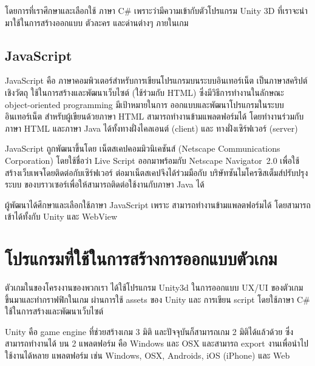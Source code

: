 โดยการที่เราศึกษาและเลือกใช้ ภาษา C\# เพราะว่ามีความเข้ากับตัวโปรแกรม 
Unity 3D ที่เราจะนำมาใช้ในการสร้างออกแบบ ตัวละคร และด่านต่างๆ ภายในเกม

\subsection{JavaScript}
JavaScript คือ ภาษาคอมพิวเตอร์สำหรับการเขียนโปรแกรมบนระบบอินเทอร์เน็ต 
เป็นภาษาสคริปต์เชิงวัตถุ ใช้ในการสร้างและพัฒนาเว็บไซต์ (ใช้ร่วมกับ HTML) 
ซึ่งมีวิธีการทำงานในลักษณะ object-oriented programming มีเป้าหมายในการ 
ออกแบบและพัฒนาโปรแกรมในระบบอินเทอร์เน็ต สำหรับผู้เขียนด้วยภาษา HTML 
สามารถทำงานข้ามแพลตฟอร์มได้ โดยทำงานร่วมกับภาษา HTML และภาษา Java 
ได้ทั้งทางฝั่งไคลเอนต์ (client) และ ทางฝั่งเซิร์ฟเวอร์ (server)

JavaScript ถูกพัฒนาขึ้นโดย เน็ตสเคปคอมมิวนิเคชันส์ 
(Netscape Communications Corporation) 
โดยใช้ชื่อว่า Live Script ออกมาพร้อมกับ Netscape Navigator~2.0 
เพื่อใช้สร้างเว็บเพจโดยติดต่อกับเซิร์ฟเวอร์
ต่อมาเน็ตสเคปจึงได้ร่วมมือกับ บริษัทซันไมโครซิสเต็มส์ปรับปรุงระบบ
ของบราวเซอร์เพื่อให้สามารถติดต่อใช้งานกับภาษา Java ได้~\cite{js}

ผู้พัฒนาได้ศึกษาและเลือกใช้ภาษา JavaScript เพราะ 
สามารถทำงานข้ามแพลตฟอร์มได้ โดยสามารถเข้าได้ทั้งกับ Unity และ WebView

\section{โปรแกรมที่ใช้ในการสร้างการออกแบบตัวเกม}
ตัวเกมในของโครงงานของพวกเรา ได้ใช้โปรแกรม Unity3d
ในการออกแบบ UX/UI ของตัวเกมขึ้นมาและทำกราฟฟิกในเกม 
ผ่านการใช้ assets ของ Unity และ การเขียน script 
โดยใช้ภาษา C\# ใช้ในการสร้างและพัฒนาเว็บไซต์

Unity คือ game engine ที่ช่วยสร้างเกม 3 มิติ 
และปัจจุบันก็สามารถเกม 2 มิติได้แล้วด้วย ซึ่ง 
สามารถทำงานได้ บน 2 แพลตฟอร์ม คือ Windows และ OSX 
และสามารถ export งานเพื่อนำไปใช้งานได้หลาย แพลตฟอร์ม 
เช่น Windows, OSX, Androids, iOS (iPhone) และ Web

